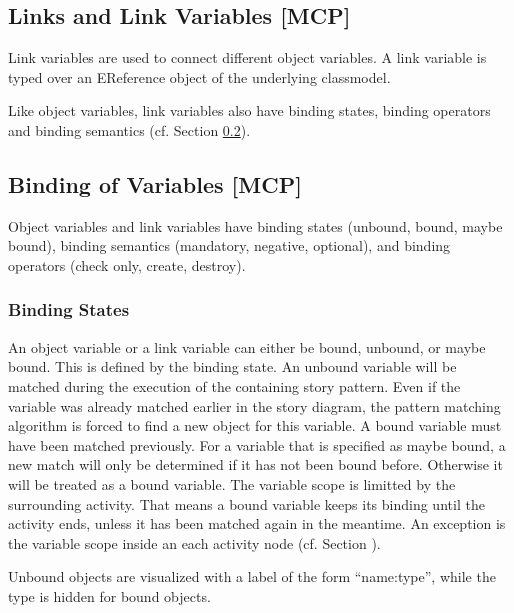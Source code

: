 \subsection{Links and Link Variables [MCP]}
\label{sec:StoryPatterns:links}

Link variables are used to connect different object variables. 
A link variable is typed over an EReference object of the underlying
classmodel.

Like object variables, link variables also have binding states, binding
operators and binding semantics (cf. Section \ref{sec:StoryPatterns:binding}).



\subsection{Binding of Variables [MCP]}
\label{sec:StoryPatterns:binding}

Object variables and link variables have binding states (unbound, bound, maybe
bound), binding semantics (mandatory, negative, optional), and binding operators
(check only, create, destroy).


\subsubsection{Binding States}
\label{sec:StoryPatterns:binding:states}
An object variable or a link variable can either be bound, unbound, or maybe
bound. This is defined by the binding state. 
An unbound variable will be matched during the execution of the containing story
pattern. 
Even if the variable was already matched earlier in the story diagram, the
pattern matching algorithm is forced to find a new object for this variable.
A bound variable must have been matched previously. 
For a variable that is specified as maybe bound, a new match will only be
determined if it has not been bound before. 
Otherwise it will be treated as a bound variable.
The variable scope is limitted by the surrounding activity. 
That means a bound variable keeps its binding until the activity ends, unless
it has been matched again in the meantime.
An exception is the variable scope inside an each activity node (cf. Section
\label{sec:StoryDiagrams:composition}).

Unbound objects are visualized with a label of the form ``name:type'', while
the type is hidden for bound objects.

